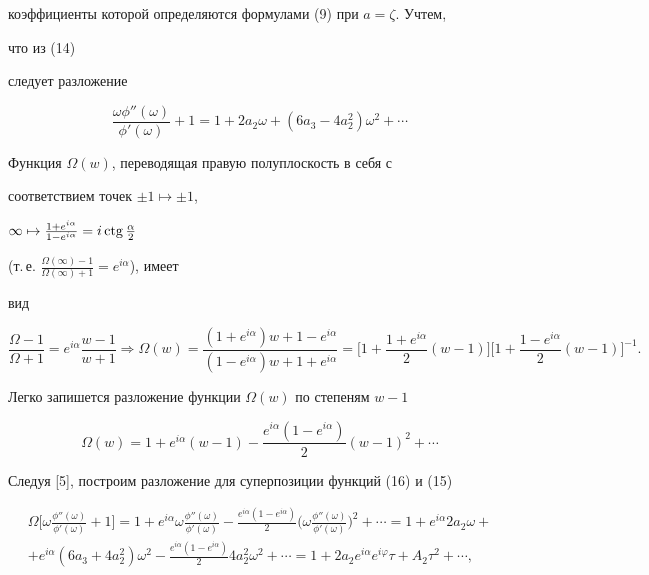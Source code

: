 коэффициенты которой определяются формулами (9) при $a=\zeta$. Учтем, 


что из (14) 


следует разложение 


\begin{equation} 


\frac{\omega\phi''(\omega)}{\phi'(\omega)}+1=1+2a_2\omega+ 


(6a_3-4a^2_2)\omega^2+\dotsb 


\end{equation} 


 


Функция $\Omega(w)$, переводящая правую полуплоскость в себя с 


соответствием точек $\pm1\mapsto\pm1$, 


$\infty\mapsto\frac{1+e^{i\alpha}}{1-e^{i\alpha}}=i \operatorname{ctg}\frac{\alpha}{2}$ 


(т.\,е. $\frac{\Omega(\infty)-1}{\Omega(\infty)+1}=e^{i\alpha}$), имеет 


вид 


$$ 


\frac{\Omega-1}{\Omega+1}=e^{i\alpha}\frac{w-1}{w+1} 


\Rightarrow \Omega(w)=\frac{(1+e^{i\alpha})w+1-e^{i\alpha}} 


{(1-e^{i\alpha})w+1+e^{i\alpha}}=\bigg[1+ 


\frac{1+e^{i\alpha}}{2}(w-1)\bigg]\bigg[1+ 


\frac{1-e^{i\alpha}}{2}(w-1)\bigg]^{-1}. 


$$ 


Легко запишется разложение функции $\Omega(w)$ по степеням $w-1$ 


\begin{equation} 


\Omega(w)=1+e^{i\alpha}(w-1)-\frac{e^{i\alpha}(1-e^{i\alpha})}{2} 


(w-1)^2+\dotsb 


\end{equation} 


 


Следуя [5], построим разложение для суперпозиции функций (16) и (15) 


\begin{multline*} 


\Omega\bigg[\omega\frac{\phi''(\omega)}{\phi'(\omega)}+1\bigg]= 


1+e^{i\alpha}\omega\frac{\phi''(\omega)}{\phi'(\omega)}- 


\frac{e^{i\alpha}(1-e^{i\alpha})}{2}\bigg(\omega 


\frac{\phi''(\omega)}{\phi'(\omega)}\bigg)^2+\dotsb= 


1+e^{i\alpha}2a_2\omega+ \\ 


% 


+e^{i\alpha}(6a_3+4a^2_2)\omega^2- 


\frac{e^{i\alpha}(1-e^{i\alpha})}{2}4a^2_2\omega^2+\dotsb= 


1+2a_2e^{i\alpha}e^{i\varphi}\tau+A_2\tau^2+\dotsb, 


\end{multline*} 


